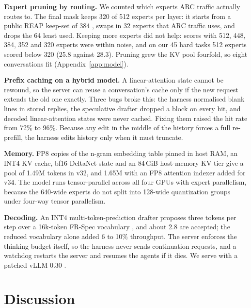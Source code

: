 \documentclass[11pt]{article}
\begin{document}
\textbf{Expert pruning by routing.} We counted which experts ARC traffic actually routes to. The final mask keeps 320 of 512 experts per layer: it starts from a public REAP keep-set of 384 \cite{reap}, swaps in 32 experts that ARC traffic uses, and drops the 64 least used. Keeping more experts did not help: scores with 512, 448, 384, 352 and 320 experts were within noise, and on our 45 hard tasks 512 experts scored below 320 (25.8 against 28.3). Pruning grew the KV pool fourfold, so eight conversations fit (Appendix~\ref{app:model}).

\textbf{Prefix caching on a hybrid model.} A linear-attention state cannot be rewound, so the server can reuse a conversation's cache only if the new request extends the old one exactly. Three bugs broke this: the harness normalised blank lines in stored replies, the speculative drafter dropped a block on every hit, and decoded linear-attention states were never cached. Fixing them raised the hit rate from 72\% to 96\%. Because any edit in the middle of the history forces a full re-prefill, the harness edits history only when it must truncate.

\textbf{Memory.} FP8 copies of the n-gram embedding table pinned in host RAM, an INT4 KV cache, bf16 DeltaNet state and an 84\,GiB host-memory KV tier give a pool of 1.49M tokens in v32, and 1.65M with an FP8 attention indexer added for v34. The model runs tensor-parallel across all four GPUs with expert parallelism, because the 640-wide experts do not split into 128-wide quantization groups under four-way tensor parallelism.

\textbf{Decoding.} An INT4 multi-token-prediction drafter \cite{mtp,specdec} proposes three tokens per step over a 16k-token FR-Spec vocabulary \cite{frspec}, and about 2.8 are accepted; the reduced vocabulary alone added 6 to 10\% throughput. The server enforces the thinking budget itself, so the harness never sends continuation requests, and a watchdog restarts the server and resumes the agents if it dies. We serve with a patched vLLM 0.30 \cite{vllm}.

\section{Discussion}
\end{document}
